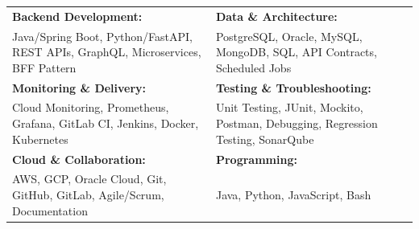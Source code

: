 \renewcommand{\arraystretch}{1.2}

\begin{tabular}{p{} p{}}
    \textbf{Backend Development:} & \textbf{Data \& Architecture:} \\
    Java/Spring Boot, Python/FastAPI, REST APIs, GraphQL, Microservices, BFF Pattern & PostgreSQL, Oracle, MySQL, MongoDB, SQL, API Contracts, Scheduled Jobs \\

    \textbf{Monitoring \& Delivery:} & \textbf{Testing \& Troubleshooting:} \\
    Cloud Monitoring, Prometheus, Grafana, GitLab CI, Jenkins, Docker, Kubernetes & Unit Testing, JUnit, Mockito, Postman, Debugging, Regression Testing, SonarQube \\

    \textbf{Cloud \& Collaboration:} & \textbf{Programming:} \\
    AWS, GCP, Oracle Cloud, Git, GitHub, GitLab, Agile/Scrum, Documentation & Java, Python, JavaScript, Bash \\
\end{tabular}
